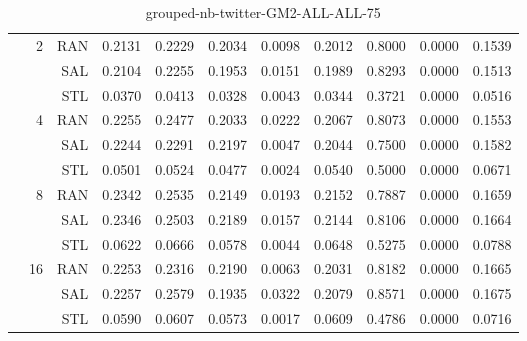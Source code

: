 \begin{center}
\begin{table}[htbp]
\begin{center}
\begin{tabular}{ | r | r | r | r | r | r | r | r | r | r | r |}
 & \multirow{3}{*}{2} & RAN & 0.2131 & 0.2229 & 0.2034 & 0.0098 & 0.2012 & 0.8000 & 0.0000 & 0.1539\\ \cline{3-11}
 &   & SAL & 0.2104 & 0.2255 & 0.1953 & 0.0151 & 0.1989 & 0.8293 & 0.0000 & 0.1513\\ \cline{3-11}
 &   & STL & 0.0370 & 0.0413 & 0.0328 & 0.0043 & 0.0344 & 0.3721 & 0.0000 & 0.0516\\ \cline{2-11}
 & \multirow{3}{*}{4} & RAN & 0.2255 & 0.2477 & 0.2033 & 0.0222 & 0.2067 & 0.8073 & 0.0000 & 0.1553\\ \cline{3-11}
 &   & SAL & 0.2244 & 0.2291 & 0.2197 & 0.0047 & 0.2044 & 0.7500 & 0.0000 & 0.1582\\ \cline{3-11}
 &   & STL & 0.0501 & 0.0524 & 0.0477 & 0.0024 & 0.0540 & 0.5000 & 0.0000 & 0.0671\\ \cline{2-11}
 & \multirow{3}{*}{8} & RAN & 0.2342 & 0.2535 & 0.2149 & 0.0193 & 0.2152 & 0.7887 & 0.0000 & 0.1659\\ \cline{3-11}
 &   & SAL & 0.2346 & 0.2503 & 0.2189 & 0.0157 & 0.2144 & 0.8106 & 0.0000 & 0.1664\\ \cline{3-11}
 &   & STL & 0.0622 & 0.0666 & 0.0578 & 0.0044 & 0.0648 & 0.5275 & 0.0000 & 0.0788\\ \cline{2-11}
 & \multirow{3}{*}{16} & RAN & 0.2253 & 0.2316 & 0.2190 & 0.0063 & 0.2031 & 0.8182 & 0.0000 & 0.1665\\ \cline{3-11}
 &   & SAL & 0.2257 & 0.2579 & 0.1935 & 0.0322 & 0.2079 & 0.8571 & 0.0000 & 0.1675\\ \cline{3-11}
 &   & STL & 0.0590 & 0.0607 & 0.0573 & 0.0017 & 0.0609 & 0.4786 & 0.0000 & 0.0716\\ \cline{2-11}
\hline
\end{tabular}
\caption{grouped-nb-twitter-GM2-ALL-ALL-75}
\end{center}
 \end{table}
\end{center}

